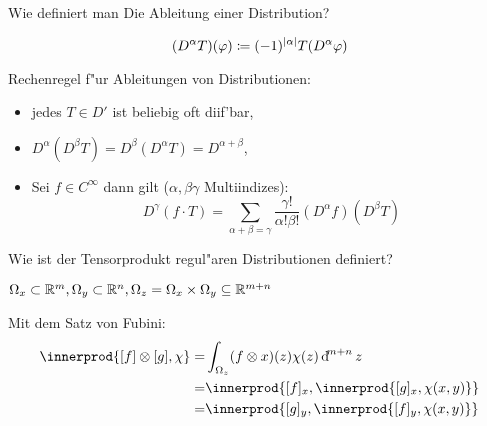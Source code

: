 \documentclass[9pt]{article}
\newcommand{\Rn}{\mathbb{R}^n}
\newcommand{\R}[1]{%
	\ifthenelse{\equal{#1}{}}
		{\mathbb{R}}
		{\mathbb{R}^{#1}}}%
\DeclarePairedDelimiter{\innerprod}\langle\rangle
\newenvironment{field}{}{\newpage}
\newif\ifnote
\newenvironment{note}{\notetrue}{\notefalse}
\begin{document}
\begin{note}
					\begin{field}  %
						Wie definiert man Die Ableitung einer Distribution?
					\end{field}
					
					\begin{field}  %
						\begin{equation*}
							(D^\alpha T)(\varphi) \coloneq (-1)^{\abs{\alpha}}T(D^\alpha \varphi)
						\end{equation*}
					\end{field}
						
					\begin{field}  %
						Rechenregel f"ur Ableitungen von Distributionen:
					\end{field}
					
					\begin{field}  %
						\begin{itemize}
							\item jedes $T\in D'$ ist beliebig oft diif'bar,
							\item $D^\alpha(D^\beta T) = D^\beta(D^\alpha T) = D^{\alpha + \beta}$,
							\item Sei $f\in C^\infty$ dann gilt ($\alpha,\beta\gamma$ Multiindizes):
							\begin{equation*}
								D^\gamma(f\cdot T) = \sum_{\alpha + \beta = \gamma} \frac{\gamma!}{\alpha!\beta!}(D^\alpha f)(D^\beta T)
							\end{equation*}
						\end{itemize}
					\end{field}
						
					\begin{field}  %
						Wie ist der Tensorprodukt regul"aren Distributionen definiert?
					\end{field}
					
					\begin{field}  %
						$\Omega_x \subset \R{m}, \Omega_y \subset \Rn, \Omega_z = \Omega_x \times \Omega_y \subseteq \R{m+n}$
						
						Mit dem Satz von Fubini:
						\begin{align*}
						\innerprod{[f]\otimes [g], \chi} =& \int_{\Omega_z} (f \otimes x)(z)\chi(z)\dif^{m+n}z\\
						 =& \innerprod{[f]_x, \innerprod{[g]_x, \chi(x,y)}} \\
						=&\innerprod{[g]_y, \innerprod{[f]_y, \chi(x,y)}}
						\end{align*}
					\end{field}
						

\end{note}
\end{document}
